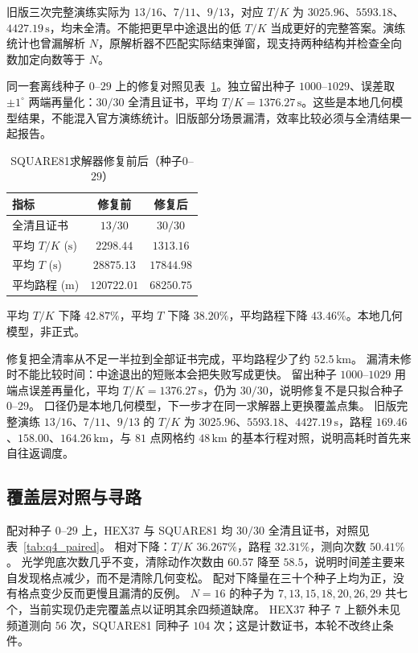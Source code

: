 旧版三次完整演练实际为 $13/16$、$7/11$、$9/13$，对应 $T/K$ 为 $3025.96$、$5593.18$、$4427.19\,\mathrm{s}$，均未全清。不能把更早中途退出的低 $T/K$ 当成更好的完整答案。演练统计也曾漏解析 $N$，原解析器不匹配实际结束弹窗，现支持两种结构并检查全向数加定向数等于 $N$。

同一套离线种子 $0$--$29$ 上的修复对照见表~\ref{tab:q4_repair}。独立留出种子 $1000$--$1029$、误差取 $\pm 1^\circ$ 两端再量化：$30/30$ 全清且证书，平均 $T/K=1376.27\,\mathrm{s}$。这些是本地几何模型结果，不能混入官方演练统计。旧版部分场景漏清，效率比较必须与全清结果一起报告。

\begin{table}[H]
\centering
\caption{SQUARE81求解器修复前后（种子$0$--$29$）}
\label{tab:q4_repair}
\begin{tabular}{lcc}
\hline
指标 & 修复前 & 修复后 \\
\hline
全清且证书 & $13/30$ & $30/30$ \\
平均 $T/K$ ($\mathrm{s}$) & $2298.44$ & $1313.16$ \\
平均 $T$ ($\mathrm{s}$) & $28875.13$ & $17844.98$ \\
平均路程 ($\mathrm{m}$) & $120722.01$ & $68250.75$ \\
\hline
\end{tabular}

\vspace{0.4em}
{\small 平均 $T/K$ 下降 $42.87\%$，平均 $T$ 下降 $38.20\%$，平均路程下降 $43.46\%$。本地几何模型，非正式。}
\end{table}

修复把全清率从不足一半拉到全部证书完成，平均路程少了约 $52.5\,\mathrm{km}$。
漏清未修时不能比较时间：中途退出的短账本会把失败写成更快。
留出种子 $1000$--$1029$ 用端点误差再量化，平均 $T/K=1376.27\,\mathrm{s}$，仍为 $30/30$，说明修复不是只拟合种子 $0$--$29$。
口径仍是本地几何模型，下一步才在同一求解器上更换覆盖点集。
旧版完整演练 $13/16$、$7/11$、$9/13$ 的 $T/K$ 为 $3025.96$、$5593.18$、$4427.19\,\mathrm{s}$，路程 $169.46$、$158.00$、$164.26\,\mathrm{km}$，与 $81$ 点网格约 $48\,\mathrm{km}$ 的基本行程对照，说明高耗时首先来自往返调度。

\subsection{覆盖层对照与寻路}

配对种子 $0$--$29$ 上，HEX37 与 SQUARE81 均 $30/30$ 全清且证书，对照见表~\ref{tab:q4_paired}。
相对下降：$T/K$ $36.267\%$，路程 $32.31\%$，测向次数 $50.41\%$。
光学兜底次数几乎不变，清除动作次数由 $60.57$ 降至 $58.5$，说明时间差主要来自发现格点减少，而不是清除几何变松。
配对下降量在三十个种子上均为正，没有格点变少反而更慢且漏清的反例。
$N=16$ 的种子为 $7,13,15,18,20,26,29$ 共七个，当前实现仍走完覆盖点以证明其余四频道缺席。
HEX37 种子 $7$ 上额外未见频道测向 $56$ 次，SQUARE81 同种子 $104$ 次；这是计数证书，本轮不改终止条件。

